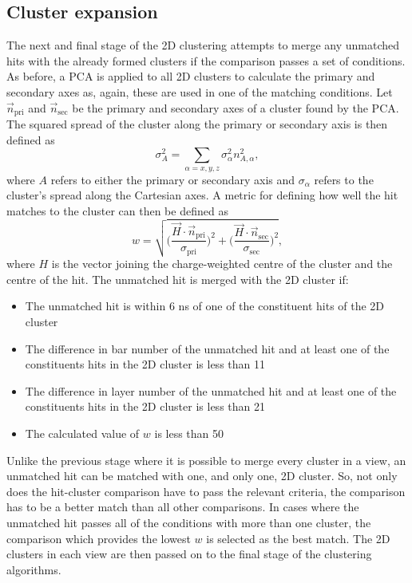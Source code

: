 \subsection{Cluster expansion}
\label{subsec:ECalExpandClusters}
The next and final stage of the 2D clustering attempts to merge any unmatched hits with the already formed clusters if the comparison passes a set of conditions.  As before, a PCA is applied to all 2D clusters to calculate the primary and secondary axes as, again,  these are used in one of the matching conditions.  Let $\vec{n}_{\mathrm{pri}}$ and $\vec{n}_{\mathrm{sec}}$ be the primary and secondary axes of a cluster found by the PCA.  The squared spread of the cluster along the primary or secondary axis is then defined as
\begin{equation}
  \sigma_A^2 = \sum_{\alpha = x,y,z} \sigma_\alpha^2n_{A,\alpha}^2,
\end{equation}
where $A$ refers to either the primary or secondary axis and $\sigma_\alpha$ refers to the cluster's spread along the Cartesian axes.  A metric for defining how well the hit matches to the cluster can then be defined as 
\begin{equation}
  w = \sqrt{\Bigg(\frac{\vec{H}\cdot \vec{n}_{\mathrm{pri}}}{\sigma_{\mathrm{pri}}}\Bigg)^2 +  \Bigg(\frac{\vec{H}\cdot \vec{n}_{\mathrm{sec}}}{\sigma_{\mathrm{sec}}}\Bigg)^2},
\end{equation}
where $H$ is the vector joining the charge-weighted centre of the cluster and the centre of the hit.  The unmatched hit is merged with the 2D cluster if:
\begin{itemize}
  \item The unmatched hit is within 6 ns of one of the constituent hits of the 2D cluster
  \item The difference in bar number of the unmatched hit and at least one of the constituents hits in the 2D cluster is less than 11
  \item The difference in layer number of the unmatched hit and at least one of the constituents hits in the 2D cluster is less than 21
  \item The calculated value of $w$ is less than 50
\end{itemize}
Unlike the previous stage where it is possible to merge every cluster in a view, an unmatched hit can be matched with one, and only one, 2D cluster. So, not only does the hit-cluster comparison have to pass the relevant criteria, the comparison has to be a better match than all other comparisons.  In cases where the unmatched hit passes all of the conditions with more than one cluster, the comparison which provides the lowest $w$ is selected as the best match.
\newline
\newline
The 2D clusters in each view are then passed on to the final stage of the clustering algorithms.

